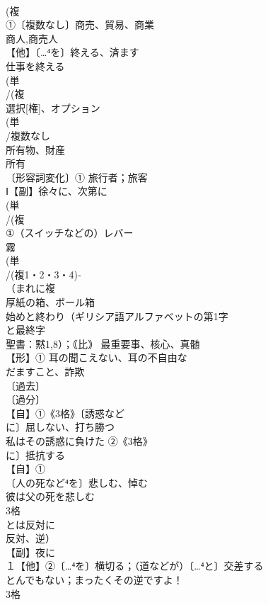 \documentclass[8pt]{extreport}
\begin{document}
\begin{CJK}{UTF8}{min}
\\	(複
\\	①〔複数なし〕商売、貿易、商業 
\\	商人,商売人
\\	【他】〔…⁴を〕終える、済ます 
\\	仕事を終える
\\	(単
\\	/(複
\\	選択[権]、オプション 
\\	(単
\\	/複数なし 
\\	所有物、財産 
\\	所有 
\\	〔形容詞変化〕① 旅行者；旅客 
\\	Ⅰ【副】徐々に、次第に
\\	(単
\\	/(複
\\	①（スイッチなどの）レバー 
\\	霧 
\\	(単
\\	/(複1・2・3・4)‐
\\	（まれに複
\\	厚紙の箱、ボール箱
\\	始めと終わり（ギリシア語アルファベットの第1字
\\	と最終字
\\	聖書：黙1,8）；｟比｠ 最重要事、核心、真髄
\\	【形】① 耳の聞こえない、耳の不自由な 
\\	だますこと、詐欺 
\\	〔過去〕
\\	〔過分〕
\\	【自】①《3格》〔誘惑など
\\	に〕屈しない、打ち勝つ 
\\	私はその誘惑に負けた ②《3格》
\\	に〕抵抗する
\\	【自】①
\\	〔人の死など⁴を〕悲しむ、悼む 
\\	彼は父の死を悲しむ
\\	3格	
\\	とは反対に 
\\	反対、逆）
\\	【副】夜に 
\\	１【他】②〔…⁴を〕横切る；（道などが）〔…⁴と〕交差する
\\	とんでもない；まったくその逆ですよ！
\\	3格 

\end{CJK}
\end{document}

